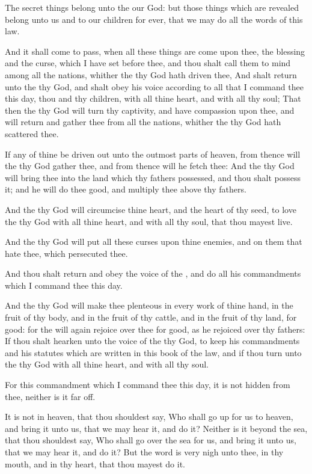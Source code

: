 \Verse The secret things belong unto the \LORD our God: but those things which are revealed belong unto us and to our children for ever, that we may do all the words of this law.


\Chapter
\Verse And it shall come to pass, when all these things are come upon thee, the blessing and the curse, which I have set before thee, and thou shalt call them to mind among all the nations, whither the \LORD thy God hath driven thee, \Verse And shalt return unto the \LORD thy God, and shalt obey his voice according to all that I command thee this day, thou and thy children, with all thine heart, and with all thy soul; \Verse That then the \LORD thy God will turn thy captivity, and have compassion upon thee, and will return and gather thee from all the nations, whither the \LORD thy God hath scattered thee.

\Verse If any of thine be driven out unto the outmost parts of heaven, from thence will the \LORD thy God gather thee, and from thence will he fetch thee: \Verse And the \LORD thy God will bring thee into the land which thy fathers possessed, and thou shalt possess it; and he will do thee good, and multiply thee above thy fathers.

\Verse And the \LORD thy God will circumcise thine heart, and the heart of thy seed, to love the \LORD thy God with all thine heart, and with all thy soul, that thou mayest live.

\Verse And the \LORD thy God will put all these curses upon thine enemies, and on them that hate thee, which persecuted thee.

\Verse And thou shalt return and obey the voice of the \LORD, and do all his commandments which I command thee this day.

\Verse And the \LORD thy God will make thee plenteous in every work of thine hand, in the fruit of thy body, and in the fruit of thy cattle, and in the fruit of thy land, for good: for the \LORD will again rejoice over thee for good, as he rejoiced over thy fathers: \Verse If thou shalt hearken unto the voice of the \LORD thy God, to keep his commandments and his statutes which are written in this book of the law, and if thou turn unto the \LORD thy God with all thine heart, and with all thy soul.

\Verse For this commandment which I command thee this day, it is not hidden from thee, neither is it far off.

\Verse It is not in heaven, that thou shouldest say, Who shall go up for us to heaven, and bring it unto us, that we may hear it, and do it?  \Verse Neither is it beyond the sea, that thou shouldest say, Who shall go over the sea for us, and bring it unto us, that we may hear it, and do it?  \Verse But the word is very nigh unto thee, in thy mouth, and in thy heart, that thou mayest do it.

